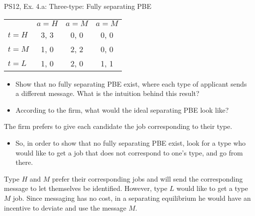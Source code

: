 \begin{frame}{PS12, Ex. 4.a: Three-type: Fully separating PBE}
    \begin{table}
      \begin{tabular}{l|c|c|c|}
          \multicolumn{1}{c}{} & \multicolumn{1}{c}{$a=H$} & \multicolumn{1}{c}{$a=M$} & \multicolumn{1}{c}{$a=M$} \\\cline{2-4}
          $t=H$ & 3, 3 & 0, 0 & 0, 0 \\\cline{2-4}
          $t=M$ & 1, 0 & 2, 2 & 0, 0 \\\cline{2-4}
          $t=L$ & 1, 0 & 2, 0 & 1, 1 \\\cline{2-4}
      \end{tabular}
    \end{table}\vspace{-8pt}
    \begin{itemize}
      \item[(a)] Show that no fully separating PBE exist, where each type of applicant sends a different message. What is the intuition behind this result?
      \item[Step 1:] According to the firm, what would the ideal separating PBE look like?
    \end{itemize}\vspace{-6pt}
    The firm prefers to give each candidate the job corresponding to their type.\vspace{-4pt}
    \begin{itemize}
      \item[Step 2:] So, in order to show that no fully separating PBE exist, look for a type who would like to get a job that does not correspond to one's type, and go from there.
    \end{itemize}\vspace{-6pt}
    Type $H$ and $M$ prefer their corresponding jobs and will send the corresponding message to let themselves be identified. However, type $L$ would like to get a type $M$ job. Since messaging has no cost, in a separating equilibrium he would have an incentive to deviate and use the message $M$.
    \vfill\null
\end{frame}
